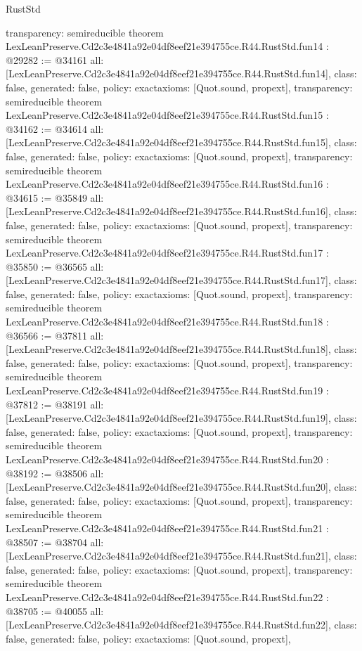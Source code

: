 \begin{lexlean}{RustStd}
\begin{coremodule}
{  transparency: semireducible
}
theorem LexLeanPreserve.Cd2c3e4841a92e04df8eef21e394755ce.R44.RustStd.fun14 : @29282 := @34161 {
  all: [LexLeanPreserve.Cd2c3e4841a92e04df8eef21e394755ce.R44.RustStd.fun14],
  class: false,
  generated: false,
  policy: exact{axioms: [Quot.sound, propext]},
  transparency: semireducible
}
theorem LexLeanPreserve.Cd2c3e4841a92e04df8eef21e394755ce.R44.RustStd.fun15 : @34162 := @34614 {
  all: [LexLeanPreserve.Cd2c3e4841a92e04df8eef21e394755ce.R44.RustStd.fun15],
  class: false,
  generated: false,
  policy: exact{axioms: [Quot.sound, propext]},
  transparency: semireducible
}
theorem LexLeanPreserve.Cd2c3e4841a92e04df8eef21e394755ce.R44.RustStd.fun16 : @34615 := @35849 {
  all: [LexLeanPreserve.Cd2c3e4841a92e04df8eef21e394755ce.R44.RustStd.fun16],
  class: false,
  generated: false,
  policy: exact{axioms: [Quot.sound, propext]},
  transparency: semireducible
}
theorem LexLeanPreserve.Cd2c3e4841a92e04df8eef21e394755ce.R44.RustStd.fun17 : @35850 := @36565 {
  all: [LexLeanPreserve.Cd2c3e4841a92e04df8eef21e394755ce.R44.RustStd.fun17],
  class: false,
  generated: false,
  policy: exact{axioms: [Quot.sound, propext]},
  transparency: semireducible
}
theorem LexLeanPreserve.Cd2c3e4841a92e04df8eef21e394755ce.R44.RustStd.fun18 : @36566 := @37811 {
  all: [LexLeanPreserve.Cd2c3e4841a92e04df8eef21e394755ce.R44.RustStd.fun18],
  class: false,
  generated: false,
  policy: exact{axioms: [Quot.sound, propext]},
  transparency: semireducible
}
theorem LexLeanPreserve.Cd2c3e4841a92e04df8eef21e394755ce.R44.RustStd.fun19 : @37812 := @38191 {
  all: [LexLeanPreserve.Cd2c3e4841a92e04df8eef21e394755ce.R44.RustStd.fun19],
  class: false,
  generated: false,
  policy: exact{axioms: [Quot.sound, propext]},
  transparency: semireducible
}
theorem LexLeanPreserve.Cd2c3e4841a92e04df8eef21e394755ce.R44.RustStd.fun20 : @38192 := @38506 {
  all: [LexLeanPreserve.Cd2c3e4841a92e04df8eef21e394755ce.R44.RustStd.fun20],
  class: false,
  generated: false,
  policy: exact{axioms: [Quot.sound, propext]},
  transparency: semireducible
}
theorem LexLeanPreserve.Cd2c3e4841a92e04df8eef21e394755ce.R44.RustStd.fun21 : @38507 := @38704 {
  all: [LexLeanPreserve.Cd2c3e4841a92e04df8eef21e394755ce.R44.RustStd.fun21],
  class: false,
  generated: false,
  policy: exact{axioms: [Quot.sound, propext]},
  transparency: semireducible
}
theorem LexLeanPreserve.Cd2c3e4841a92e04df8eef21e394755ce.R44.RustStd.fun22 : @38705 := @40055 {
  all: [LexLeanPreserve.Cd2c3e4841a92e04df8eef21e394755ce.R44.RustStd.fun22],
  class: false,
  generated: false,
  policy: exact{axioms: [Quot.sound, propext]},
}
\end{coremodule}
\end{lexlean}
